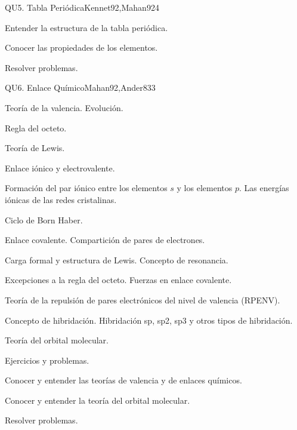 \begin{syllabus}
\begin{unit}{QU5. Tabla Periódica}{Kennet92,Mahan92}{4}
   \begin{learningoutcomes}
      \item Entender la estructura de la tabla periódica.
      \item Conocer las propiedades de los elementos.
      \item Resolver problemas.
   \end{learningoutcomes}
\end{unit}

\begin{unit}{QU6. Enlace Químico}{Mahan92,Ander83}{3}
   \begin{topics}
	\item Teoría de  la valencia. Evolución.
	\item Regla del octeto.
	\item Teoría de Lewis.
	\item Enlace iónico y electrovalente.
	\item Formación del par iónico entre los elementos $s$ y los elementos $p$. Las energías iónicas de las redes cristalinas.
	\item Ciclo de Born Haber.
	\item Enlace covalente. Compartición de pares de electrones.
	\item Carga formal y estructura de Lewis. Concepto de resonancia.
	\item Excepciones a la regla del octeto. Fuerzas en enlace covalente.
	\item Teoría de la repulsión de pares electrónicos del nivel de valencia (RPENV).
	\item Concepto de hibridación. Hibridación sp, sp2, sp3 y otros tipos de hibridación.
	\item Teoría del orbital molecular.
	\item Ejercicios y problemas.
   \end{topics}

   \begin{learningoutcomes}
      \item Conocer y entender las teorías de valencia y de enlaces químicos.
      \item Conocer y entender la teoría del orbital molecular.
      \item Resolver problemas.
   \end{learningoutcomes}
\end{unit}


\end{syllabus}
